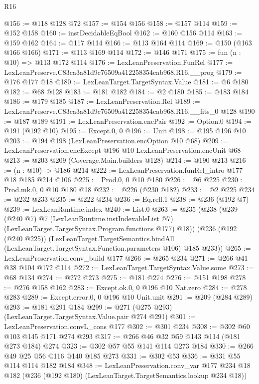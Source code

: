 \begin{lexlean}{R16}
\begin{coremodule}
@156 := @118 @128 @72
@157 := @154 @156
@158 := @157 @114
@159 := @152 @158
@160 := instDecidableEqBool
@162 := @160 @156 @114
@163 := @159 @162
@164 := @117 @114
@166 := @113 @164 @114
@169 := @150 (@163 @166 @166)
@171 := @113 @169 @114
@172 := @146 @171
@175 := fun (n : @10) => @113 @172 @114
@176 := LexLeanPreservation.FunRel
@177 := LexLeanPreserve.C83ca3a81d9c76509a412258354cab968.R16.__prog
@179 := @176 @177 @18
@180 := LexLeanTarget.TargetSyntax.Value
@181 := @6 @180
@182 := @68 @128
@183 := @181 @182
@184 := @2 @180
@185 := @183 @184
@186 := @179 @185
@187 := LexLeanPreservation.Rel
@189 := LexLeanPreserve.C83ca3a81d9c76509a412258354cab968.R16.__fits_0 @128
@190 := @187 @189
@191 := LexLeanPreservation.encPair
@192 := Option.{0}
@194 := @191 (@192 @10)
@195 := Except.{0, 0}
@196 := Unit
@198 := @195 @196 @10
@203 := @194 @198 (LexLeanPreservation.encOption @10 @68)
@209 := LexLeanPreservation.encExcept @196 @10 LexLeanPreservation.encUnit @68
@213 := @203 @209 (Coverage.Main.builders @128)
@214 := @190 @213
@216 := (n : @10) -> @186 @214
@222 := LexLeanPreservation.funRel_intro @177 @18 @185 @214 @106
@225 := Prod.{0, 0} @10 @180
@226 := @6 @225
@230 := Prod.mk.{0, 0} @10 @180 @18
@232 := @226 (@230 @182)
@233 := @2 @225
@234 := @232 @233
@235 := @222 @234
@236 := Eq.refl.{1}
@238 := @236 (@192 @7)
@239 := LexLeanRuntime.index
@240 := List.{0}
@263 := @235
    (@238
      (@239
        (@240 @7)
        @7
        (LexLeanRuntime.instIndexableList @7)
        (LexLeanTarget.TargetSyntax.Program.functions @177)
        @18))
    (@236
      (@192 (@240 @225))
      (LexLeanTarget.TargetSemantics.bindAll
        (LexLeanTarget.TargetSyntax.Function.parameters @106)
        @185
        @233))
@265 := LexLeanPreservation.conv_build @177
@266 := @265 @234
@271 := @266 @41 @38 @104 @172 @114
@272 := LexLeanTarget.TargetSyntax.Value.some
@273 := @68 @134
@274 := @272 @273
@275 := @181 @274
@276 := @151 @198
@278 := @276 @158 @162
@283 := Except.ok.{0, 0} @196 @10 Nat.zero
@284 := @278 @283
@289 := Except.error.{0, 0} @196 @10 Unit.unit
@291 := @209 (@284 @289)
@293 := @181 @291 @184
@299 := @271 (@275 @293) (LexLeanTarget.TargetSyntax.Value.pair @274 @291)
@301 := LexLeanPreservation.convL_cons @177
@302 := @301 @234
@308 := @302 @60 @103 @145 @171 @274 @293
@317 := @266 @46 @32 @59 @143 @114 (@181 @273 @184) @274
@323 := @302 @57 @55 @141 @114 @273 @184
@330 := @266 @49 @25 @56 @116 @140 @185 @273
@331 := @302 @53
@336 := @331 @55 @114 @114 @182 @184
@348 := LexLeanPreservation.conv_var
    @177
    @234
    @18
    @182
    (@236 (@192 @180) (LexLeanTarget.TargetSemantics.lookup @234 @18))

\end{coremodule}
\end{lexlean}
